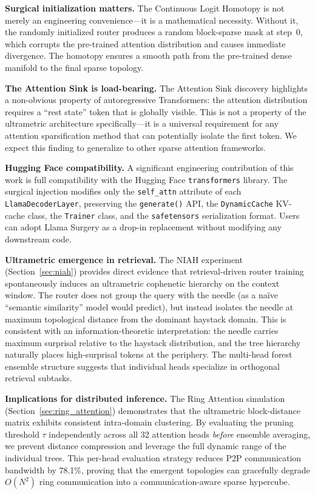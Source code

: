 \documentclass[11pt,a4paper]{article}
\begin{document}
\textbf{Surgical initialization matters.} The Continuous Logit Homotopy is not merely an engineering convenience---it is a mathematical necessity. Without it, the randomly initialized router produces a random block-sparse mask at step~0, which corrupts the pre-trained attention distribution and causes immediate divergence. The homotopy ensures a smooth path from the pre-trained dense manifold to the final sparse topology.

\textbf{The Attention Sink is load-bearing.} The Attention Sink discovery highlights a non-obvious property of autoregressive Transformers: the attention distribution requires a ``rest state'' token that is globally visible. This is not a property of the ultrametric architecture specifically---it is a universal requirement for any attention sparsification method that can potentially isolate the first token. We expect this finding to generalize to other sparse attention frameworks.

\textbf{Hugging Face compatibility.} A significant engineering contribution of this work is full compatibility with the Hugging Face \texttt{transformers} library. The surgical injection modifies only the \texttt{self\_attn} attribute of each \texttt{LlamaDecoderLayer}, preserving the \texttt{generate()} API, the \texttt{DynamicCache} KV-cache class, the \texttt{Trainer} class, and the \texttt{safetensors} serialization format. Users can adopt Llama Surgery as a drop-in replacement without modifying any downstream code.

\textbf{Ultrametric emergence in retrieval.} The NIAH experiment (Section~\ref{sec:niah}) provides direct evidence that retrieval-driven router training spontaneously induces an ultrametric cophenetic hierarchy on the context window. The router does not group the query with the needle (as a na\"ive ``semantic similarity'' model would predict), but instead isolates the needle at maximum topological distance from the dominant haystack domain. This is consistent with an information-theoretic interpretation: the needle carries maximum surprisal relative to the haystack distribution, and the tree hierarchy naturally places high-surprisal tokens at the periphery. The multi-head forest ensemble structure suggests that individual heads specialize in orthogonal retrieval subtasks.

\textbf{Implications for distributed inference.} The Ring Attention simulation (Section~\ref{sec:ring_attention}) demonstrates that the ultrametric block-distance matrix exhibits consistent intra-domain clustering. By evaluating the pruning threshold $\tau$ independently across all 32 attention heads \emph{before} ensemble averaging, we prevent distance compression and leverage the full dynamic range of the individual trees. This per-head evaluation strategy reduces P2P communication bandwidth by 78.1\%, proving that the emergent topologies can gracefully degrade $O(N^2)$ ring communication into a communication-aware sparse hypercube.
\end{document}
